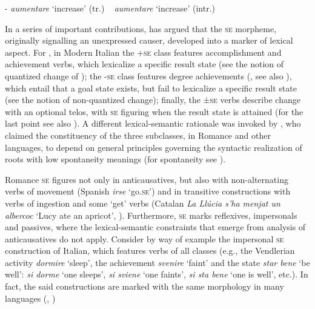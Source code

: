 \documentclass[output=paper,colorlinks,citecolor=brown
]{langscibook}
\begin{document}
\ex \label{bentley_example_1c}	
 - \textit{aumentare} ‘increase’ (tr.) ~ \textit{aumentare} ‘increase’ (intr.)  \\
\z
\z

In a series of important contributions, \citet{cennamo1995patterns,cennamo1999late,cennamo2012aspectual,cennamo2015valency,cennamo2021anticausatives,cennamo2022anticausativization} has argued that the \textsc{se} morpheme, originally signalling an unexpressed causer, developed into a marker of lexical aspect. For \citet{cennamo2012aspectual}, in Modern Italian the +\textsc{se} class features accomplishment and achievement verbs, which lexicalize a specific result state (see the notion of quantized change of \cite{hay1999scalar,beavers2011affectedness}); the -\textsc{se} class features degree achievements 
(\cite[88—90]{dowty1979word}, see also \cite{bertinetto1995attempt,hay1999scalar,beavers2011affectedness}), which entail that a goal state exists, but fail to lexicalize a specific result state (see the notion of non-quantized change);  finally, the ±\textsc{se} verbs describe change with an optional telos, with \textsc{se} figuring when the result state is attained (for the last point see also \cites[{}][161—163]{folli2002constructing,jezek2003classi}). A different lexical-semantic rationale was invoked by \citet[96, 114—120]{alexiadou2015external}, who claimed the constituency of the three subclasses, in Romance and other languages, to depend on general principles governing the syntactic realization of roots with low spontaneity meanings (for spontaneity see \cite{haspelmath1993more,haspelmath2016universals}). 

Romance \textsc{se} figures not only in anticausatives, but also with non-alternating verbs of movement (Spanish \textit{irse} ‘go.\textsc{se}’) and in transitive constructions with verbs of ingestion and some ‘get’ verbs \citep[48]{levin1993english} (Catalan \textit{La Llúcia s’ha menjat un albercoc} ‘Lucy ate an apricot’, \cite[505]{acedomatellan2022argument}). Furthermore, \textsc{se} marks reflexives, impersonals and passives, where the lexical-semantic constraints that emerge from analysis of anticausatives do not apply. Consider by way of example the impersonal \textsc{se} construction of Italian, which features verbs of all classes (e.g., the Vendlerian activity \textit{dormire} ‘sleep’, the achievement \textit{svenire} ‘faint’ and the state \textit{star bene} ‘be well’: \textit{si dorme} ‘one sleeps’, \textit{si sviene} ‘one faints’, \textit{si sta bene} ‘one is well’, etc.). In fact, the said constructions are marked with the same morphology in many languages (\cite[371—374]{lyons1969introduction}, \cite{kemmer1993middle,beavers2023middle}) 
\end{document}
